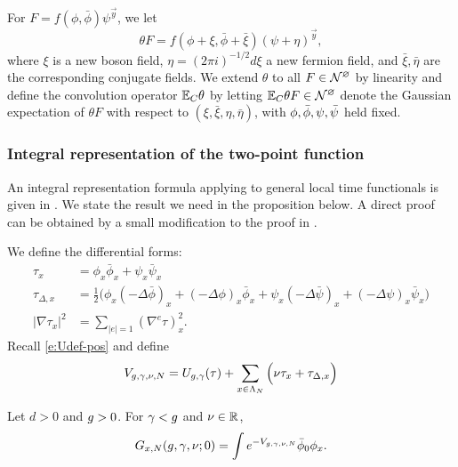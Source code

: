 For $F = f(\phi, \bar\phi) \psi^{\vec y}$, we let
\begin{equation}
\theta F = f(\phi + \xi, \bar\phi + \bar\xi) (\psi + \eta)^{\vec y},
\end{equation}
where $\xi$ is a new boson field, $\eta = (2\pi i)^{-1/2} d\xi$ a new fermion field,
and $\bar\xi, \bar\eta$ are the corresponding conjugate fields.
We extend $\theta$ to all $F \in \mathcal{N}^\varnothing$ by linearity
and define the convolution operator $\mathbb{E}_C\theta$ by letting
$\mathbb{E}_C\theta F \in \mathcal{N}^\varnothing$ denote the Gaussian expectation of $\theta F$ with respect
to $(\xi, \bar\xi, \eta, \bar\eta)$, with $\phi,\bar\phi,\psi,\bar\psi$ held fixed.

\subsubsection{Integral representation of the two-point function}
\label{sec:Gintrep}

An integral representation formula applying to general local time functionals
is given in \cite{BEI92,BIS09}. We state the result we need in the proposition below.
A direct proof can be obtained by a small modification to the proof in
\cite[Appendix~A]{ST-phi4}.

We define the differential forms:
\begin{align}
\label{e:taudef}
\tau_x
	&=
\phi_x \bar\phi_x + \psi_x \bar\psi_x
	\\
\label{e:addDelta}
\tau_{\Delta,x}
	&=
\frac 12
\Big(
	\phi_{x} (- \Delta \bar{\phi})_{x} + (- \Delta \phi)_{x} \bar{\phi}_{x}
		+
	\psi_{x}  (- \Delta \bar{\psi})_{x} + (- \Delta \psi)_{x}  \bar{\psi}_{x}
\Big)
	\\
\label{e:nablatau}
|\nabla \tau_x|^2
	&=
\sum_{|e|=1} (\nabla^e \tau)_x^2.
\end{align}
Recall \eqref{e:Udef-pos} and define
\begin{equation}
\label{e:Vdef2}
V_{g,\gamma,\nu,N}
	=
U_{g,\gamma}(\tau)
	+
\sum_{x\in\Lambda_N}
\Big(
	\nu \tau_x + \tau_{\Delta,x}
\Big)
\end{equation}

\begin{prop}
Let $d > 0$ and $g > 0$. For $\gamma < g$ and $\nu \in {\mathbb R}$,
\begin{equation}
\label{e:Grep-pos-bis}
G_{x,N}(g, \gamma, \nu; 0)
	=
\int e^{-V_{g,\gamma,\nu,N}} \bar\phi_0 \phi_x.
\end{equation}
\end{prop}

